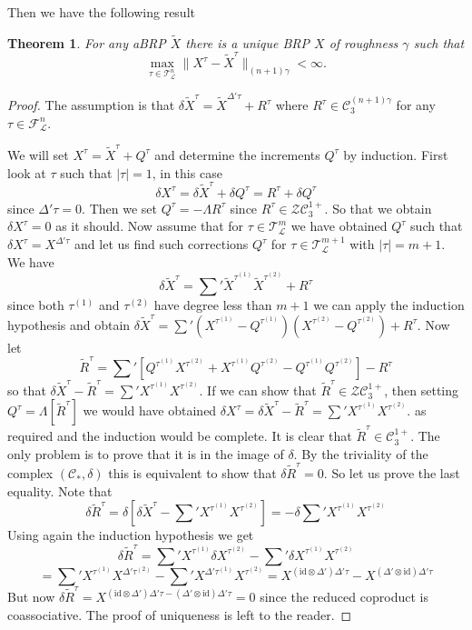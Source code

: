 \documentclass[a4paper,11pt,reqno]{article}
\newcommand{\1}{{\bf 1}}
\newcommand{\der}{\delta}
\newcommand{\FF}{\mathcal{F}}
\newcommand{\CC}{\mathcal{C}}
\newcommand{\ZZ}{\mathcal{Z}}
\newcommand{\cl}{\mathcal L}
\newtheorem{theorem}{Theorem}[section]
\newcommand{\TT}{\mathcal{T}}
\begin{document}
Then we have the following result
\begin{theorem}
\label{th:corresp}
For any aBRP $\widetilde X$ there is a unique BRP $X$ of
roughness $\gamma$ such that 
$$
\max_{\tau \in \TT_\cl^n} \|X^\tau - \widetilde X^\tau\|_{(n+1)\gamma}
< \infty .
$$
\end{theorem}
\begin{proof}
The assumption is that $\der \widetilde X^\tau = \widetilde X^{\Delta' \tau} + R^\tau$ where $R^\tau \in \CC^{(n+1)\gamma}_3$ for any $\tau \in \FF_\cl^n$.

We will set $X^\tau = \widetilde X^\tau + Q^\tau$ and determine the increments $Q^\tau$ by induction. First look at $\tau$ such that $|\tau| = 1$, in this case
$$
\der X^\tau = \der \widetilde X^\tau + \der Q^\tau = R^\tau + \der Q^\tau
$$ 
since $\Delta' \tau = 0$. Then we set $Q^\tau = -\Lambda R^\tau$ since $R^\tau \in \ZZ\CC^{1+}_3$. So that we obtain $\der X^\tau = 0$ as it should.
Now assume that for $\tau \in \TT_\cl^{m}$ we have obtained $Q^\tau$ such that $\der X^\tau = X^{\Delta' \tau}$ and let us find such corrections $Q^{\tau}$ for $\tau \in \TT_\cl^{m+1}$ with $|\tau|=m+1$. We have
$$
\der \widetilde X^{\tau} = \sum' \widetilde X^{\tau^{(1)}} \widetilde X^{\tau^{(2)}} + R^\tau 
$$
since both $\tau^{(1)}$ and $\tau^{(2)}$ have degree less than $m+1$ we can apply the induction hypothesis and obtain
$
\der \widetilde X^{\tau} = \sum' ( X^{\tau^{(1)}}- Q^{\tau^{(1)}}) ( X^{\tau^{(2)}}- Q^{\tau^{(2)}}) + R^\tau.
$
Now let
$$
\widetilde R^\tau =
 \sum'  \left[Q^{\tau^{(1)}} X^{\tau^{(2)}}+X^{\tau^{(1)}}  Q^{\tau^{(2)}}-Q^{\tau^{(1)}}  Q^{\tau^{(2)}} \right]- R^\tau
$$
so that
$
\der \widetilde X^\tau - \widetilde R^\tau =  \sum'  X^{\tau^{(1)}} X^{\tau^{(2)}}.
$
If we can show that $\widetilde R^\tau \in \ZZ \CC_3^{1+}$, then setting $Q^{\tau} = \Lambda[\widetilde R^\tau]$ we would have obtained
$
\der X^\tau = \der \widetilde X^\tau - \widetilde R^\tau =  \sum'  X^{\tau^{(1)}} X^{\tau^{(2)}}.
$
as required and the induction would be complete.
It is clear that $\widetilde R^\tau \in \CC_3^{1+}$. The only problem is to prove that it is in the image of $\der$. By the triviality of the complex $(\CC_*,\der)$ this is equivalent to show that $\der \widetilde R^\tau = 0$. So let us prove the last equality.
Note that
$$
\der \widetilde R^\tau = \der\left[\der \widetilde X^\tau - \sum'  X^{\tau^{(1)}} X^{\tau^{(2)}}\right] =-  \der \sum'  X^{\tau^{(1)}} X^{\tau^{(2)}}
$$
Using again the induction hypothesis we get
$$
\der \widetilde R^\tau =   \sum'  X^{\tau^{(1)}} \der X^{\tau^{(2)}} -   \sum' \der X^{\tau^{(1)}} X^{\tau^{(2)}} 
$$
$$= \sum' X^{\tau^{(1)}} X^{\Delta' \tau^{(2)}} - \sum' X^{\Delta' \tau^{(1)}} X^{\tau^{(2)}} = X^{(\text{id}\otimes \Delta')\Delta' \tau} -X^{(\Delta'\otimes\text{id})\Delta' \tau} 
$$
But now
$
\der \widetilde R^\tau=  X^{(\text{id}\otimes \Delta')\Delta' \tau- (\Delta'\otimes\text{id})\Delta' \tau} = 0
$
since the reduced coproduct is coassociative. The proof of uniqueness is left to the reader.
\end{proof}
\end{document}
